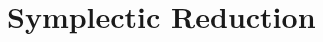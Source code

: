 \documentclass[handout,10pt]{beamer}
\begin{document}
    
      \section{Symplectic Reduction}
      \checkpoint
    
\end{document}
